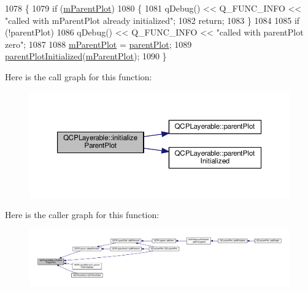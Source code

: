 \begin{DoxyCode}
1078 \{
1079   \textcolor{keywordflow}{if} (\hyperlink{class_q_c_p_layerable_aa2a528433e44db02b8aef23c1f9f90ed}{mParentPlot})
1080   \{
1081     qDebug() << Q\_FUNC\_INFO << \textcolor{stringliteral}{"called with mParentPlot already initialized"};
1082     \textcolor{keywordflow}{return};
1083   \}
1084   
1085   \textcolor{keywordflow}{if} (!parentPlot)
1086     qDebug() << Q\_FUNC\_INFO << \textcolor{stringliteral}{"called with parentPlot zero"};
1087   
1088   \hyperlink{class_q_c_p_layerable_aa2a528433e44db02b8aef23c1f9f90ed}{mParentPlot} = \hyperlink{class_q_c_p_layerable_ab7e0e94461566093d36ffc0f5312b109}{parentPlot};
1089   \hyperlink{class_q_c_p_layerable_ab20b7dbd8e0249ed61adb9622c427382}{parentPlotInitialized}(\hyperlink{class_q_c_p_layerable_aa2a528433e44db02b8aef23c1f9f90ed}{mParentPlot});
1090 \}
\end{DoxyCode}


Here is the call graph for this function\+:\nopagebreak
\begin{figure}[H]
\begin{center}
\leavevmode
\includegraphics[width=350pt]{class_q_c_p_layerable_a8cbe5a0c9a5674249982f5ca5f8e02bc_cgraph}
\end{center}
\end{figure}




Here is the caller graph for this function\+:\nopagebreak
\begin{figure}[H]
\begin{center}
\leavevmode
\includegraphics[width=350pt]{class_q_c_p_layerable_a8cbe5a0c9a5674249982f5ca5f8e02bc_icgraph}
\end{center}
\end{figure}


